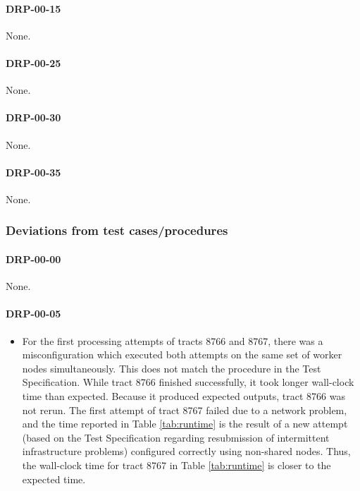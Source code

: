 \documentclass[DM,lsstdraft,STR,toc]{lsstdoc}
\begin{document}
\paragraph{DRP-00-15}
\label{sect:problems-drp-00-15}

None.

\paragraph{DRP-00-25}
\label{sect:problems-drp-00-25}

None.

\paragraph{DRP-00-30}
\label{sect:problems-drp-00-30}

None.

\paragraph{DRP-00-35}
\label{sect:problems-drp-00-35}

None.

\subsubsection{Deviations from test cases/procedures}

\paragraph{DRP-00-00}

None.

\paragraph{DRP-00-05}
\label{sect:deviation-drp-00-05}

\begin{itemize}
  \item{
    For the first processing attempts of tracts 8766 and 8767, there was a misconfiguration which executed both attempts on the same set of worker nodes simultaneously.
    This does not match the procedure in the Test Specification.
    While tract 8766 finished successfully, it took longer wall-clock time than expected.
    Because it produced expected outputs, tract 8766 was not rerun.
    The first attempt of tract 8767 failed due to a network problem, and the time reported in Table \ref{tab:runtime} is the result of a new attempt (based on the Test Specification regarding resubmission of intermittent infrastructure problems) configured correctly using non-shared nodes.
    Thus, the wall-clock time for tract 8767 in Table \ref{tab:runtime} is closer to the expected
	time.
  }
\end{itemize}
\end{document}
